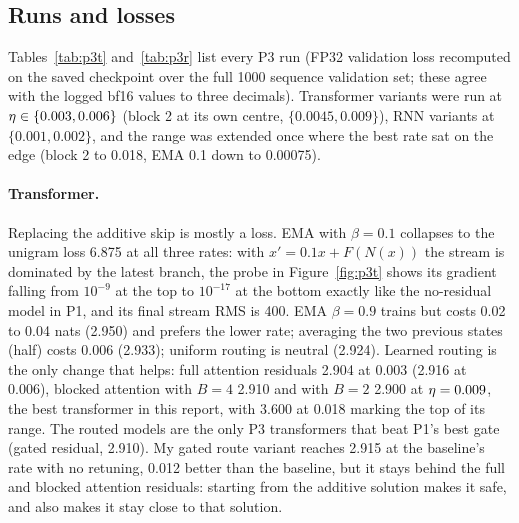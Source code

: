 \subsection{Runs and losses}
Tables~\ref{tab:p3t} and~\ref{tab:p3r} list every P3 run (FP32 validation loss recomputed on the saved checkpoint over the full 1000 sequence validation set; these agree with the logged bf16 values to three decimals). Transformer variants were run at $\eta\in\{0.003, 0.006\}$ (block 2 at its own centre, $\{0.0045, 0.009\}$), RNN variants at $\{0.001, 0.002\}$, and the range was extended once where the best rate sat on the edge (block 2 to 0.018, EMA 0.1 down to 0.00075).

\begin{table}[h]\centering\small
\caption{P3 transformers (d8). Best rate per variant in bold.}
\label{tab:p3t}

\end{table}
\begin{table}[h]\centering\small
\caption{P3 modern RNNs.}
\label{tab:p3r}

\end{table}

\paragraph{Transformer.} Replacing the additive skip is mostly a loss. EMA with $\beta=0.1$ collapses to the unigram loss 6.875 at all three rates: with $x' = 0.1x + F(N(x))$ the stream is dominated by the latest branch, the probe in Figure~\ref{fig:p3t} shows its gradient falling from $10^{-9}$ at the top to $10^{-17}$ at the bottom exactly like the no-residual model in P1, and its final stream RMS is 400. EMA $\beta=0.9$ trains but costs 0.02 to 0.04 nats (2.950) and prefers the lower rate; averaging the two previous states (half) costs 0.006 (2.933); uniform routing is neutral (2.924). Learned routing is the only change that helps: full attention residuals 2.904 at 0.003 (2.916 at 0.006), blocked attention with $B=4$ 2.910 and with $B=2$ 2.900 at $\eta=0.009$, the best transformer in this report, with 3.600 at 0.018 marking the top of its range. The routed models are the only P3 transformers that beat P1's best gate (gated residual, 2.910). My gated route variant reaches 2.915 at the baseline's rate with no retuning, 0.012 better than the baseline, but it stays behind the full and blocked attention residuals: starting from the additive solution makes it safe, and also makes it stay close to that solution.

